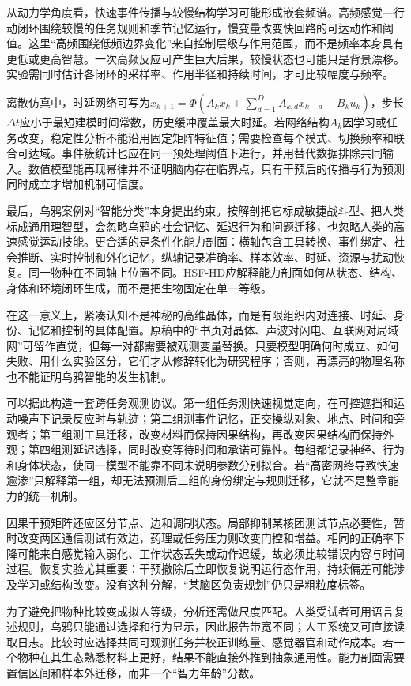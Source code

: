 从动力学角度看，快速事件传播与较慢结构学习可能形成嵌套频谱。高频感觉—行动闭环围绕较慢的任务规则和季节记忆运行，慢变量改变快回路的可达动作和阈值。这里“高频围绕低频边界变化”来自控制层级与作用范围，而不是频率本身具有更低或更高智慧。一次高频反应可产生巨大后果，较慢状态也可能只是背景漂移。实验需同时估计各闭环的采样率、作用半径和持续时间，才可比较幅度与频率。

离散仿真中，时延网络可写为$x_{k+1}=\Phi(A_kx_k+\sum_{d=1}^{D}A_{k,d}x_{k-d}+B_ku_k)$，步长$\Delta t$应小于最短建模时间常数，历史缓冲覆盖最大时延。若网络结构$A_k$因学习或任务改变，稳定性分析不能沿用固定矩阵特征值；需要检查每个模式、切换频率和联合可达域。事件簇统计也应在同一预处理阈值下进行，并用替代数据排除共同输入。数值模型能再现幂律并不证明脑内存在临界点，只有干预后的传播与行为预测同时成立才增加机制可信度。

最后，乌鸦案例对“智能分类”本身提出约束。按解剖把它标成敏捷战斗型、把人类标成通用理智型，会忽略乌鸦的社会记忆、延迟行为和问题迁移，也忽略人类的高速感觉运动技能。更合适的是条件化能力剖面：横轴包含工具转换、事件绑定、社会推断、实时控制和外化记忆，纵轴记录准确率、样本效率、时延、资源与扰动恢复。同一物种在不同轴上位置不同。HSF-HD应解释能力剖面如何从状态、结构、身体和环境闭环生成，而不是把生物固定在单一等级。

在这一意义上，紧凑认知不是神秘的高维晶体，而是有限组织内对连接、时延、身份、记忆和控制的具体配置。原稿中的“书页对晶体、声波对闪电、互联网对局域网”可留作直觉，但每一对都需要被观测变量替换。只要模型明确何时成立、如何失败、用什么实验区分，它们才从修辞转化为研究程序；否则，再漂亮的物理名称也不能证明乌鸦智能的发生机制。

可以据此构造一套跨任务观测协议。第一组任务测快速视觉定向，在可控遮挡和运动噪声下记录反应时与轨迹；第二组测事件记忆，正交操纵对象、地点、时间和旁观者；第三组测工具迁移，改变材料而保持因果结构，再改变因果结构而保持外观；第四组测延迟选择，同时改变等待时间和承诺可靠性。每组都记录神经、行为和身体状态，使同一模型不能靠不同未说明参数分别拟合。若“高密网络导致快速逾渗”只解释第一组，却无法预测后三组的身份绑定与规则迁移，它就不是整章能力的统一机制。

因果干预矩阵还应区分节点、边和调制状态。局部抑制某核团测试节点必要性，暂时改变两区通信测试有效边，药理或任务压力则改变门控和增益。相同的正确率下降可能来自感觉输入弱化、工作状态丢失或动作迟缓，故必须比较错误内容与时间过程。恢复实验尤其重要：干预撤除后立即恢复说明运行态作用，持续偏差可能涉及学习或结构改变。没有这种分解，“某脑区负责规划”仍只是粗粒度标签。

为了避免把物种比较变成拟人等级，分析还需做尺度匹配。人类受试者可用语言复述规则，乌鸦只能通过选择和行为显示，因此报告带宽不同；人工系统又可直接读取日志。比较时应选择共同可观测任务并校正训练量、感觉器官和动作成本。若一个物种在其生态熟悉材料上更好，结果不能直接外推到抽象通用性。能力剖面需要置信区间和样本外迁移，而非一个“智力年龄”分数。

